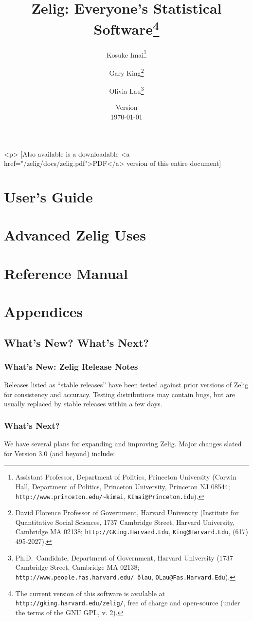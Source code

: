 \documentclass[oneside,letterpaper,12pt]{book}
\title{Zelig: Everyone's Statistical Software\thanks{The current
    version of this software is available at
    \texttt{http://gking.harvard.edu/zelig/}, free of charge and
    open-source (under the terms of the GNU GPL, v. 2).}}
\author{Kosuke
  Imai\thanks{Assistant Professor, Department of Politics, Princeton
    University (Corwin Hall, Department of Politics, Princeton
    University, Princeton NJ 08544; \texttt{http://www.princeton.edu/\~{}kimai},
    \texttt{KImai@Princeton.Edu}).}
\and %
Gary King\thanks{David Florence Professor of Government, Harvard
  University (Institute for Quantitative Social Sciences, 1737 Cambridge 
Street, Harvard University, Cambridge MA 02138;
  \texttt{http://GKing.Harvard.Edu}, \texttt{King@Harvard.Edu}, (617)
  495-2027).}
\and %
Olivia Lau\thanks{Ph.D.\ Candidate, Department of Government, Harvard
  University (1737 Cambridge Street, Cambridge MA 02138;
  \texttt{http://www.people.fas.harvard.edu/\~\,olau},
  \texttt{OLau@Fas.Harvard.Edu}).}}
\date{Version \\ \today}
\begin{document}
\maketitle
\begin{rawhtml}
  <p>
  [Also available is a downloadable <a href="/zelig/docs/zelig.pdf">PDF</a>
  version of this entire document]
\end{rawhtml}

\tableofcontents

\nobibliography*





\part[User's Guide]{User's Guide}
\part{Advanced Zelig Uses}
\part{Reference Manual}

\appendix

\part[Appendices]{Appendices}

%

\chapter{What's New?  What's Next?}

\section{What's New:  Zelig Release Notes}\label{release.notes}

Releases listed as ``stable releases'' have been tested against prior
versions of Zelig for consistency and accuracy.  Testing distributions
may contain bugs, but are usually replaced by stable releases within a
few days. 

\section{What's Next?}

We have several plans for expanding and improving Zelig.  Major
changes slated for Version 3.0 (and beyond) include:  



\end{document}
